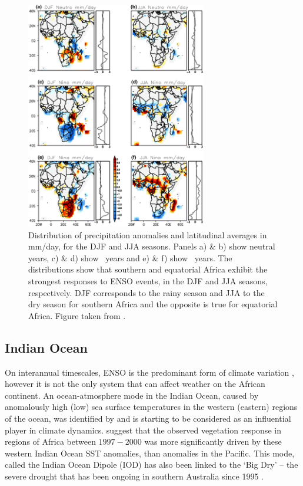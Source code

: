 \begin{figure}
  \centering
  \includegraphics[width=0.7\textwidth]{figures/enso_africa_rainfall_anoms}
  \caption{Distribution of precipitation anomalies and latitudinal averages in
    mm/day, for the DJF and JJA seasons. Panels a) \& b) show neutral years, c)
    \& d) show \elnino\ years and e) \& f) show \nina\ years. The distributions
    show that southern and equatorial Africa exhibit the strongest responses to
    ENSO events, in the DJF and JJA seasons, respectively. DJF corresponds to the
    rainy season and JJA to the dry season for southern Africa and the opposite
    is true for equatorial Africa. Figure taken from \cite{deoliveira2018}.}
  \label{fig:enso_rainfall_anoms}
\end{figure}

\subsection{Indian Ocean}
On interannual timescales, ENSO is the predominant form of climate variation
\citep{obrien1998}, however it is not the only system that can affect weather on
the African continent. An ocean-atmosphere mode in the Indian Ocean, caused by
anomalously high (low) sea surface temperatures in the western (eastern) regions
of the ocean, was identified by \cite{saji1999} and is starting to be considered
as an influential player in climate dynamics. \cite{anyamba2002} suggest that
the observed vegetation response in regions of Africa between $1997-2000$ was
more significantly driven by these western Indian Ocean SST anomalies, than
anomalies in the Pacific. This mode, called the Indian Ocean Dipole (IOD) has
also been linked to the `Big Dry' -- the severe drought that has been ongoing in
southern Australia since 1995 \citep{karumuri2003, ummenhofer2009}.

